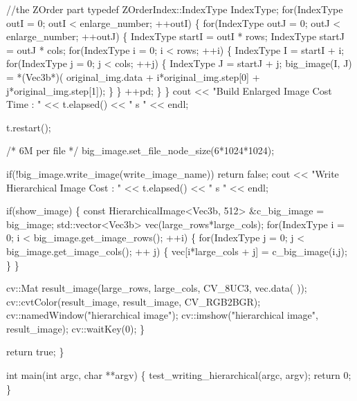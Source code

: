 \begin{DoxyCodeInclude}
        \textcolor{comment}{//the ZOrder part}
        \textcolor{keyword}{typedef} ZOrderIndex::IndexType IndexType;
        \textcolor{keywordflow}{for}(IndexType outI = 0; outI < enlarge\_number; ++outI) \{
                \textcolor{keywordflow}{for}(IndexType outJ = 0; outJ < enlarge\_number; ++outJ) \{
                        IndexType startI = outI * rows;
                        IndexType startJ = outJ * cols;
                        \textcolor{keywordflow}{for}(IndexType i = 0; i < rows; ++i) \{
                                IndexType I = startI + i;
                                \textcolor{keywordflow}{for}(IndexType j = 0; j < cols; ++j) \{
                                        IndexType J = startJ + j;
                                        big\_image(I, J) = *(Vec3b*)(
      original\_img.data + i*original\_img.step[0] + j*original\_img.step[1]);
                                \}
                        \}
                        ++pd;
                \}
        \}
        cout << \textcolor{stringliteral}{"Build Enlarged Image Cost Time : "} << t.elapsed() << \textcolor{stringliteral}{" s "} << 
      endl;

        t.restart();

        \textcolor{comment}{/* 6M per file */}
        big\_image.set_file_node_size(6*1024*1024);

        \textcolor{keywordflow}{if}(!big\_image.write_image(write\_image\_name)) \textcolor{keywordflow}{return} \textcolor{keyword}{false};
        cout << \textcolor{stringliteral}{"Write Hierarchical Image Cost : "} << t.elapsed() << \textcolor{stringliteral}{" s "} << 
      endl;

        \textcolor{keywordflow}{if}(show\_image) \{
                \textcolor{keyword}{const} HierarchicalImage<Vec3b, 512> &c\_big\_image = big\_image;
                std::vector<Vec3b> vec(large\_rows*large\_cols);
                \textcolor{keywordflow}{for}(IndexType i = 0; i < big\_image.get\_image\_rows(); ++i) \{
                        \textcolor{keywordflow}{for}(IndexType j = 0; j < big\_image.get\_image\_cols(); ++
      j) \{
                                vec[i*large\_cols  + j] = c\_big\_image(i,j);
                        \}
                \}

                cv::Mat result\_image(large\_rows, large\_cols, CV\_8UC3, vec.data(
      ));
                cv::cvtColor(result\_image, result\_image, CV\_RGB2BGR);
                cv::namedWindow(\textcolor{stringliteral}{"hierarchical image"});
                cv::imshow(\textcolor{stringliteral}{"hierarchical image"}, result\_image);
                cv::waitKey(0);
        \}

        \textcolor{keywordflow}{return} \textcolor{keyword}{true};
\}

\textcolor{keywordtype}{int} main(\textcolor{keywordtype}{int} argc, \textcolor{keywordtype}{char} **argv)
\{
        test\_writing\_hierarchical(argc, argv);
        \textcolor{keywordflow}{return} 0;
\}
\end{DoxyCodeInclude}
 